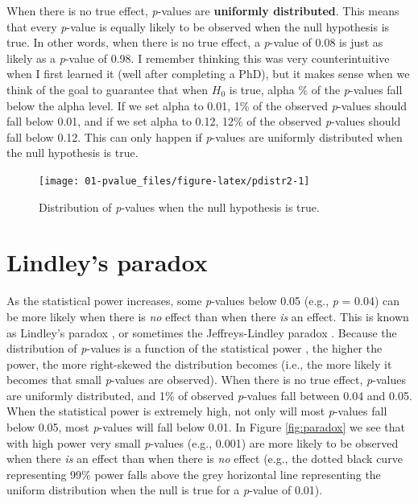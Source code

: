 \documentclass[
  oneside]{krantz}
\begin{document}
When there is no true effect, \emph{p}-values are \textbf{uniformly distributed}. This means that every \emph{p}-value is equally likely to be observed when the null hypothesis is true. In other words, when there is no true effect, a \emph{p}-value of 0.08 is just as likely as a \emph{p}-value of 0.98. I remember thinking this was very counterintuitive when I first learned it (well after completing a PhD), but it makes sense when we think of the goal to guarantee that when \(H_0\) is true, alpha \% of the \emph{p}-values fall below the alpha level. If we set alpha to 0.01, 1\% of the observed \emph{p}-values should fall below 0.01, and if we set alpha to 0.12, 12\% of the observed \emph{p}-values should fall below 0.12. This can only happen if \emph{p}-values are uniformly distributed when the null hypothesis is true.



\begin{figure}

{\centering \texttt{[image: 01-pvalue\_files/figure-latex/pdistr2-1]} 

}

\caption{Distribution of \emph{p}-values when the null hypothesis is true.}\label{fig:pdistr2}
\end{figure}

\hypertarget{lindley}{%
\section{Lindley's paradox}\label{lindley}}

As the statistical power increases, some \emph{p}-values below 0.05 (e.g., \emph{p} = 0.04) can be more likely when there is \emph{no} effect than when there \emph{is} an effect. This is known as Lindley's paradox \citep{lindley_statistical_1957}, or sometimes the Jeffreys-Lindley paradox \citep{spanos_who_2013}. Because the distribution of \emph{p}-values is a function of the statistical power \citep{cumming_replication_2008}, the higher the power, the more right-skewed the distribution becomes (i.e., the more likely it becomes that small \emph{p}-values are observed). When there is no true effect, \emph{p}-values are uniformly distributed, and 1\% of observed \emph{p}-values fall between 0.04 and 0.05. When the statistical power is extremely high, not only will most \emph{p}-values fall below 0.05, most \emph{p}-values will fall below 0.01. In Figure \ref{fig:paradox} we see that with high power very small \emph{p}-values (e.g., 0.001) are more likely to be observed when there \emph{is} an effect than when there is \emph{no} effect (e.g., the dotted black curve representing 99\% power falls above the grey horizontal line representing the uniform distribution when the null is true for a \emph{p}-value of 0.01).
\end{document}
